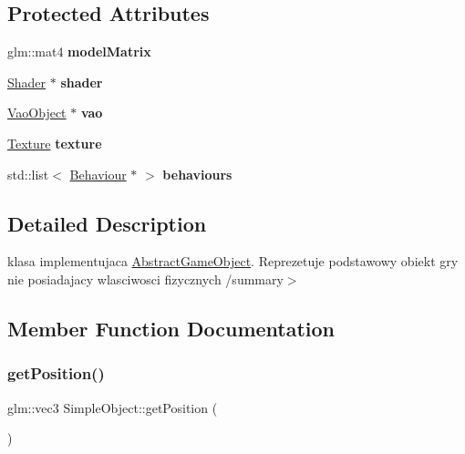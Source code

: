 \subsection*{Protected Attributes}
\begin{DoxyCompactItemize}
\item 
\mbox{\label{class_simple_object_afb4e75c108263067f5347198a5e1d890}} 
glm\+::mat4 {\bfseries model\+Matrix}
\item 
\mbox{\label{class_simple_object_aa2c839c6fd33d925ffe37949c2f365a8}} 
\hyperlink{class_shader}{Shader} $\ast$ {\bfseries shader}
\item 
\mbox{\label{class_simple_object_a8339746daf36763a8a4312a19ff123de}} 
\hyperlink{class_vao_object}{Vao\+Object} $\ast$ {\bfseries vao}
\item 
\mbox{\label{class_simple_object_af94137a8b0e4e71adba0a828263f523a}} 
\hyperlink{class_texture}{Texture} {\bfseries texture}
\item 
\mbox{\label{class_simple_object_ac47c5390bef50cb4b852119274b66ab9}} 
std\+::list$<$ \hyperlink{class_behaviour}{Behaviour} $\ast$ $>$ {\bfseries behaviours}
\end{DoxyCompactItemize}


\subsection{Detailed Description}
klasa implementujaca \hyperlink{class_abstract_game_object}{Abstract\+Game\+Object}. Reprezetuje podstawowy obiekt gry nie posiadajacy wlasciwosci fizycznych /summary$>$ 

\subsection{Member Function Documentation}
\mbox{\label{class_simple_object_acaf96b4cf35863ca69a123d9404f4e5f}} 
\subsubsection{\texorpdfstring{get\+Position()}{getPosition()}}
{\footnotesize\ttfamily glm\+::vec3 Simple\+Object\+::get\+Position (\begin{DoxyParamCaption}{ }\end{DoxyParamCaption})\hspace{0.3cm}{\ttfamily [virtual]}}

